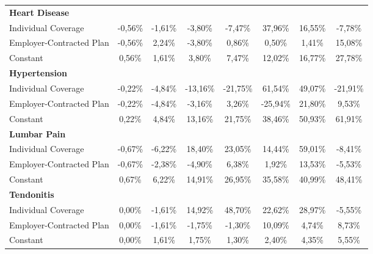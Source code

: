 \documentclass{article}
\begin{document}
\begin{table*}
{\begin{tabular}{l*{7}{c}}
\midrule
\textbf{Heart Disease}  & & & & & & & \\

Individual Coverage      & -0,56\%\sym{*}  & -1,61\%\sym{**} & -3,80\%\sym{***}& -7,47\%\sym{***}& 37,96\%         & 16,55\%         & -7,78\%         \\
Employer-Contracted Plan & -0,56\%\sym{*}  &  2,24\%         & -3,80\%\sym{***}&  0,86\%         &  0,50\%         &  1,41\%         & 15,08\%         \\
Constant                 &  0,56\%\sym{*}  &  1,61\%\sym{**} &  3,80\%\sym{***}&  7,47\%\sym{***}& 12,02\%\sym{***}& 16,77\%\sym{***}& 27,78\%\sym{***}\\

\midrule
\textbf{Hypertension}  & & & & & & & \\

Individual Coverage      & -0,22\%         & -4,84\%\sym{***}&-13,16\%\sym{***}&-21,75\%\sym{***}& \cellcolor[gray]{0.9} 61,54\%\sym{***}& \cellcolor[gray]{0.9} 49,07\%\sym{***}&-21,91\%         \\
Employer-Contracted Plan & -0,22\%         & -4,84\%\sym{***}& -3,16\%         &  3,26\%         &-25,94\%\sym{*}  & 21,80\%         &  9,53\%         \\
Constant                 &  0,22\%         &  4,84\%\sym{***}& 13,16\%\sym{***}& 21,75\%\sym{***}& 38,46\%\sym{***}& 50,93\%\sym{***}& 61,91\%\sym{***}\\

\midrule
\textbf{Lumbar Pain}  & & & & & & & \\

Individual Coverage      & -0,67\%\sym{*}  & -6,22\%\sym{***}& 18,40\%         & 23,05\%         & 14,44\%         & \cellcolor[gray]{0.9} 59,01\%\sym{***}& -8,41\%         \\
Employer-Contracted Plan & -0,67\%\sym{*}  & -2,38\%         & -4,90\%         &  6,38\%         &  1,92\%         & 13,53\%         & -5,53\%         \\
Constant                 &  0,67\%\sym{*}  &  6,22\%\sym{***}& 14,91\%\sym{***}& 26,95\%\sym{***}& 35,58\%\sym{***}& 40,99\%\sym{***}& 48,41\%\sym{***}\\

\midrule
\textbf{Tendonitis}  & & & & & & & \\

Individual Coverage      &  0,00\%         & -1,61\%\sym{**} & 14,92\%         & 48,70\%         & 22,62\%         & 28,97\%         & -5,55\%\sym{**} \\
Employer-Contracted Plan &  0,00\%         & -1,61\%\sym{**} & -1,75\%\sym{*}  & -1,30\%\sym{*}  & 10,09\%         &  4,74\%         &  8,73\%         \\
Constant                 &  0,00\%         &  1,61\%\sym{**} &  1,75\%\sym{*}  &  1,30\%\sym{*}  &  2,40\%\sym{*}  &  4,35\%\sym{**} &  5,55\%\sym{**} \\


\end{tabular}}
\end{table*}
\end{document}
